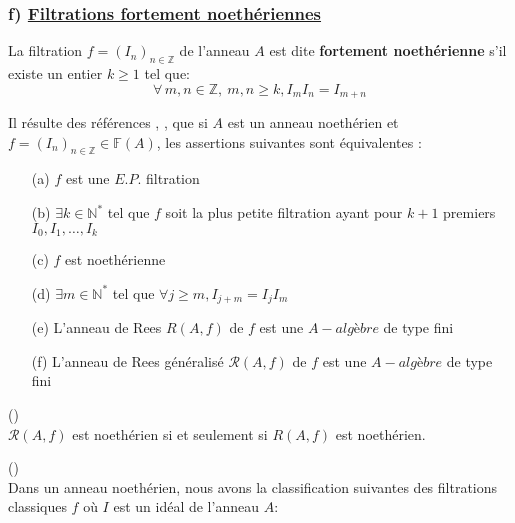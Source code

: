\subsubsection{f) \underline{Filtrations fortement noethériennes}}
\begin{madefinition}
	La filtration $f = (I_n)_{n \in \mathbb{Z}}$ de l'anneau $A$ est dite \textbf{fortement noethérienne} s'il existe un entier $k \geqslant 1$ tel que:
	\[ \forall \, m, n \in \mathbb{Z}, \ m, n \geqslant k, I_m I_n = I_{m+n} \]
\end{madefinition}
\begin{maremarque}
	Il résulte des références \cite{4} , \cite{5}, \cite{6} que si $A$ est un anneau noethérien et $f=(I_n)_{n \in \mathbb{Z}} \in \mathbb{F}(A)$, les assertions suivantes sont équivalentes : 
	\begin{enumerate}
		\item[(a)] $f$ est une $E.P.$ filtration
		\item[(b)] $\exists k \in \mathbb{N}^{*}$ tel que $f$ soit la plus petite filtration ayant pour $k+1$ premiers $I_0, I_1,\dots, I_k $
		\item[(c)] $f$ est noethérienne
		\item[(d)] $\exists m \in \mathbb{N}^{*}$ tel que $\forall j \geqslant m, I_{j+m} = I_{j}I_{m}$
		\item[(e)] L'anneau de Rees $R(A,f)$ de $f$ est une $A-algèbre$ de type fini
		\item[(f)] L'anneau de Rees généralisé $\mathcal{R}(A,f)$ de $f$ est une $A-algèbre$ de type fini
	\end{enumerate}
\end{maremarque}
\begin{maremarque}(\cite{2})\\
	$\mathcal{R}(A,f)$ est noethérien si et seulement si $R(A,f)$ est noethérien.
\end{maremarque}

\begin{maremarque}(\cite{2})\\
	Dans un anneau noethérien, nous avons la classification suivantes des filtrations \\ classiques $f$ où $I$ est un idéal de l'anneau $A$:
	\begin{center}
	\end{center}
	
	
\end{maremarque}


